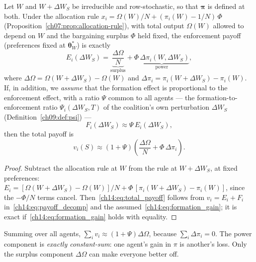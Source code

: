 \documentclass[../structural_economics_book.tex]{subfiles}
\begin{document}
\begin{proposition}\label{ch14:prop:power_gain}
Let $W$ and $W + \Delta W_S$ be irreducible and row-stochastic, so that $\boldsymbol{\pi}$ is defined at both. Under the allocation rule $x_i = \Omega(W)/N + (\pi_i(W) - 1/N)\,\Phi$ (Proposition~\ref{ch07:prop:allocation-rule}), with total output $\Omega(W)$ allowed to depend on $W$ and the bargaining surplus $\Phi$ held fixed, the enforcement payoff (preferences fixed at $\boldsymbol{\theta}^*_W$) is exactly
\begin{equation}\label{ch14:eq:power_gain}
E_i(\Delta W_S) = \underbrace{\frac{\Delta\Omega}{N}}_{\text{surplus}} + \underbrace{\Phi\,\Delta\pi_i(W, \Delta W_S)}_{\text{power}},
\end{equation}
where $\Delta\Omega = \Omega(W + \Delta W_S) - \Omega(W)$ and $\Delta\pi_i = \pi_i(W + \Delta W_S) - \pi_i(W)$. If, in addition, we \emph{assume} that the formation effect is proportional to the enforcement effect, with a ratio $\Psi$ common to all agents --- the formation-to-enforcement ratio $\Psi_i(\Delta W_S, T)$ of the coalition's own perturbation $\Delta W_S$ (Definition~\ref{ch09:def:psi}) ---
\begin{equation}\label{ch14:eq:formation_gain}
F_i(\Delta W_S) \approx \Psi\, E_i(\Delta W_S),
\end{equation}
then the total payoff is
\begin{equation}\label{ch14:eq:total_payoff}
v_i(S) \approx (1 + \Psi)\left(\frac{\Delta\Omega}{N} + \Phi\,\Delta\pi_i\right).
\end{equation}
\end{proposition}

\begin{proof}
Subtract the allocation rule at $W$ from the rule at $W + \Delta W_S$, at fixed preferences: $E_i = [\Omega(W+\Delta W_S) - \Omega(W)]/N + \Phi\,[\pi_i(W+\Delta W_S) - \pi_i(W)]$, since the $-\Phi/N$ terms cancel. Then~\eqref{ch14:eq:total_payoff} follows from $v_i = E_i + F_i$ in~\eqref{ch14:eq:payoff_decomp} and the assumed~\eqref{ch14:eq:formation_gain}; it is exact if~\eqref{ch14:eq:formation_gain} holds with equality.
\end{proof}

Summing over all agents, $\sum_i v_i \approx (1+\Psi)\Delta\Omega$, because $\sum_i \Delta\pi_i = 0$. The power component is \emph{exactly constant-sum}: one agent's gain in $\pi$ is another's loss. Only the surplus component $\Delta\Omega$ can make everyone better off.
\end{document}
